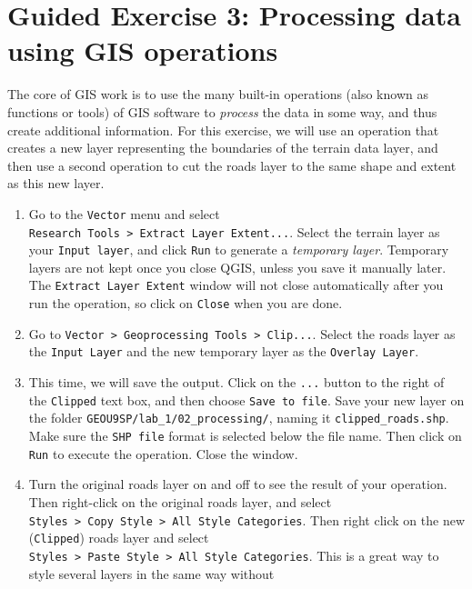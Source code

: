 \documentclass[
  letterpaper,
  DIV=11,
  numbers=noendperiod]{scrreprt}
\begin{document}
\section{Guided Exercise 3: Processing data using GIS
operations}\label{guided-exercise-3-processing-data-using-gis-operations}

The core of GIS work is to use the many built-in operations (also known
as functions or tools) of GIS software to \emph{process} the data in
some way, and thus create additional information. For this exercise, we
will use an operation that creates a new layer representing the
boundaries of the terrain data layer, and then use a second operation to
cut the roads layer to the same shape and extent as this new layer.

\begin{enumerate}
\def\labelenumi{(\arabic{enumi})}
\setcounter{enumi}{27}
\item
  Go to the \texttt{Vector} menu and select
  \texttt{Research\ Tools\ \textgreater{}\ Extract\ Layer\ Extent...}.
  Select the terrain layer as your \texttt{Input\ layer}, and click
  \texttt{Run} to generate a \emph{temporary layer}. Temporary layers
  are not kept once you close QGIS, unless you save it manually later.
  The \texttt{Extract\ Layer\ Extent} window will not close
  automatically after you run the operation, so click on \texttt{Close}
  when you are done.
\item
  Go to
  \texttt{Vector\ \textgreater{}\ Geoprocessing\ Tools\ \textgreater{}\ Clip...}.
  Select the roads layer as the \texttt{Input\ Layer} and the new
  temporary layer as the \texttt{Overlay\ Layer}.
\item
  This time, we will save the output. Click on the \texttt{...} button
  to the right of the \texttt{Clipped} text box, and then choose
  \texttt{Save\ to\ file}. Save your new layer on the folder
  \texttt{GEOU9SP/lab\_1/02\_processing/}, naming it
  \texttt{clipped\_roads.shp}. Make sure the \texttt{SHP\ file} format
  is selected below the file name. Then click on \texttt{Run} to execute
  the operation. Close the window.
\item
  Turn the original roads layer on and off to see the result of your
  operation. Then right-click on the original roads layer, and select
  \texttt{Styles\ \textgreater{}\ Copy\ Style\ \textgreater{}\ All\ Style\ Categories}.
  Then right click on the new (\texttt{Clipped}) roads layer and select
  \texttt{Styles\ \textgreater{}\ Paste\ Style\ \textgreater{}\ All\ Style\ Categories}.
  This is a great way to style several layers in the same way without

\end{enumerate}
\end{document}
